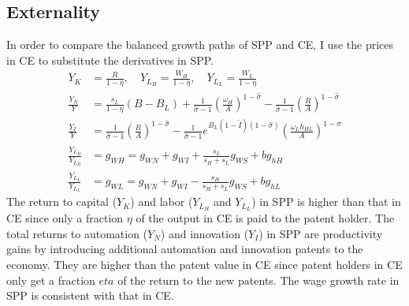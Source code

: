 \documentclass[12pt]{article}
\begin{document}
\subsection{Externality}
In order to compare the balanced growth paths of SPP and CE, I use the prices in CE to substitute the derivatives in SPP.  
\begin{align*}
Y_K &= \frac{R}{1-\eta}, \quad Y_{L_H}= \frac{W_H}{1-\eta}, \quad Y_{L_L}= \frac{W_L}{1-\eta} \\
\frac{Y_{N}}{Y} &=\frac{s_L}{1-\eta}(B-B_L)+\frac{1}{\hat{\sigma}-1}(\frac{\omega_H}{A})^{1-\hat{\sigma}}-\frac{1}{\hat{\sigma}-1}(\frac{R}{A})^{1-\hat{\sigma}} \\
\frac{Y_{I}}{Y} &=\frac{1}{\hat{\sigma}-1}(\frac{R}{A})^{1-\hat{\sigma}}-\frac{1}{\hat{\sigma}-1}e^{B_L(1-\tilde{I})(1-\hat{\sigma})}(\frac{\omega_Lh_{HL}}{A})^{1-\hat{\sigma}} \\
\frac{\dot{Y}_{L_H}}{Y_{L_H}} &= g_{WH} = g_{WN}+g_{WI}+\frac{s_L}{s_H+s_L}g_{WS} +bg_{hH}\\
\frac{\dot{Y}_{L_L}}{Y_{L_L}} &= g_{WL} = g_{WN}+g_{WI}-\frac{s_H}{s_H+s_L}g_{WS} +bg_{hL}
\end{align*}
The return to capital ($Y_K$) and labor ($Y_{L_H}$ and $Y_{L_L}$) in SPP is higher than that in CE since only a fraction $\eta$ of the output in CE is paid to the patent holder. The total returns to automation ($Y_N$) and innovation ($Y_I$) in SPP are productivity gains by introducing additional automation and innovation patents to the economy. They are higher than the patent value in CE since patent holders in CE only get a fraction $eta$ of the return to the new patents. The wage growth rate in SPP is consistent with that in CE. 
\end{document}
